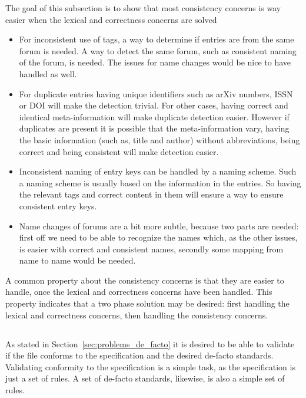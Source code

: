 The goal of this subsection is to show that most consistency concerns
is way easier when the lexical and correctness concerns are solved

\begin{itemize}
\item For inconsistent use of tags, a way to determine if entries are
  from the same forum is needed.  A way to detect the same forum, such
  as consistent naming of the forum, is needed.  The issues for name
  changes would be nice to have handled as well.

\item For duplicate entries having unique identifiers such as arXiv
  numbers, ISSN or DOI will make the detection trivial.  For other
  cases, having correct and identical meta-information will make
  duplicate detection easier.  However if duplicates are present it is
  possible that the meta-information vary, having the basic
  information (such as, title and author) without abbreviations, being
  correct and being consistent will make detection easier.

\item Inconsistent naming of entry keys can be handled by a naming
  scheme.  Such a naming scheme is usually based on the information in
  the entries.  So having the relevant tags and correct content in
  them will ensure a way to ensure consistent entry keys.

\item Name changes of forums are a bit more subtle, because two parts
  are needed: first off we need to be able to recognize the names
  which, as the other issues, is easier with correct and consistent
  names, secondly some mapping from name to name would be needed.
\end{itemize}

A common property about the consistency concerns is that they are
easier to handle, once the lexical and correctness concerns have been
handled.  This property indicates that a two phase solution may be
desired: first handling the lexical and correctness concerns, then
handling the consistency concerns.


\subsection{}

As stated in Section~\ref{sec:problems_de_facto} it is desired to be
able to validate if the file conforms to the specification and the
desired de-facto standards.  Validating conformity to the
specification is a simple task, as the specification is just a set of
rules.  A set of de-facto standards, likewise, is also a simple set of
rules.

